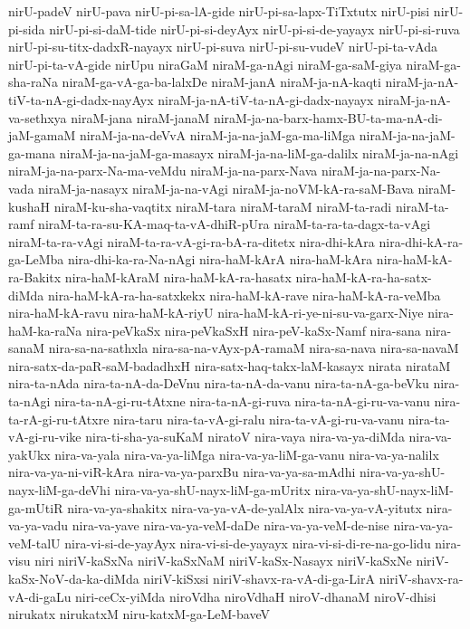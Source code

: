 {nirU-padeV
nirU-pava
nirU-pi-sa-lA-gide
nirU-pi-sa-lapx-TiTxtutx
nirU-pisi
nirU-pi-sida
nirU-pi-si-daM-tide
nirU-pi-si-deyAyx
nirU-pi-si-de-yayayx
nirU-pi-si-ruva
nirU-pi-su-titx-dadxR-nayayx
nirU-pi-suva
nirU-pi-su-vudeV
nirU-pi-ta-vAda
nirU-pi-ta-vA-gide
nirUpu
niraGaM
niraM-ga-nAgi
niraM-ga-saM-giya
niraM-ga-sha-raNa
niraM-ga-vA-ga-ba-lalxDe
niraM-janA
niraM-ja-nA-kaqti
niraM-ja-nA-tiV-ta-nA-gi-dadx-nayAyx
niraM-ja-nA-tiV-ta-nA-gi-dadx-nayayx
niraM-ja-nA-va-sethxya
niraM-jana
niraM-janaM
niraM-ja-na-barx-hamx-BU-ta-ma-nA-di-jaM-gamaM
niraM-ja-na-deVvA
niraM-ja-na-jaM-ga-ma-liMga
niraM-ja-na-jaM-ga-mana
niraM-ja-na-jaM-ga-masayx
niraM-ja-na-liM-ga-dalilx
niraM-ja-na-nAgi
niraM-ja-na-parx-Na-ma-veMdu
niraM-ja-na-parx-Nava
niraM-ja-na-parx-Na-vada
niraM-ja-nasayx
niraM-ja-na-vAgi
niraM-ja-noVM-kA-ra-saM-Bava
niraM-kushaH
niraM-ku-sha-vaqtitx
niraM-tara
niraM-taraM
niraM-ta-radi
niraM-ta-ramf
niraM-ta-ra-su-KA-maq-ta-vA-dhiR-pUra
niraM-ta-ra-ta-dagx-ta-vAgi
niraM-ta-ra-vAgi
niraM-ta-ra-vA-gi-ra-bA-ra-ditetx
nira-dhi-kAra
nira-dhi-kA-ra-ga-LeMba
nira-dhi-ka-ra-Na-nAgi
nira-haM-kArA
nira-haM-kAra
nira-haM-kA-ra-Bakitx
nira-haM-kAraM
nira-haM-kA-ra-hasatx
nira-haM-kA-ra-ha-satx-diMda
nira-haM-kA-ra-ha-satxkekx
nira-haM-kA-rave
nira-haM-kA-ra-veMba
nira-haM-kA-ravu
nira-haM-kA-riyU
nira-haM-kA-ri-ye-ni-su-va-garx-Niye
nira-haM-ka-raNa
nira-peVkaSx
nira-peVkaSxH
nira-peV-kaSx-Namf
nira-sana
nira-sanaM
nira-sa-na-sathxla
nira-sa-na-vAyx-pA-ramaM
nira-sa-nava
nira-sa-navaM
nira-satx-da-paR-saM-badadhxH
nira-satx-haq-takx-laM-kasayx
nirata
nirataM
nira-ta-nAda
nira-ta-nA-da-DeVnu
nira-ta-nA-da-vanu
nira-ta-nA-ga-beVku
nira-ta-nAgi
nira-ta-nA-gi-ru-tAtxne
nira-ta-nA-gi-ruva
nira-ta-nA-gi-ru-va-vanu
nira-ta-rA-gi-ru-tAtxre
nira-taru
nira-ta-vA-gi-ralu
nira-ta-vA-gi-ru-va-vanu
nira-ta-vA-gi-ru-vike
nira-ti-sha-ya-suKaM
niratoV
nira-vaya
nira-va-ya-diMda
nira-va-yakUkx
nira-va-yala
nira-va-ya-liMga
nira-va-ya-liM-ga-vanu
nira-va-ya-nalilx
nira-va-ya-ni-viR-kAra
nira-va-ya-parxBu
nira-va-ya-sa-mAdhi
nira-va-ya-shU-nayx-liM-ga-deVhi
nira-va-ya-shU-nayx-liM-ga-mUritx
nira-va-ya-shU-nayx-liM-ga-mUtiR
nira-va-ya-shakitx
nira-va-ya-vA-de-yalAlx
nira-va-ya-vA-yitutx
nira-va-ya-vadu
nira-va-yave
nira-va-ya-veM-daDe
nira-va-ya-veM-de-nise
nira-va-ya-veM-talU
nira-vi-si-de-yayAyx
nira-vi-si-de-yayayx
nira-vi-si-di-re-na-go-lidu
nira-visu
niri
niriV-kaSxNa
niriV-kaSxNaM
niriV-kaSx-Nasayx
niriV-kaSxNe
niriV-kaSx-NoV-da-ka-diMda
niriV-kiSxsi
niriV-shavx-ra-vA-di-ga-LirA
niriV-shavx-ra-vA-di-gaLu
niri-ceCx-yiMda
niroVdha
niroVdhaH
niroV-dhanaM
niroV-dhisi
nirukatx
nirukatxM
niru-katxM-ga-LeM-baveV
}
